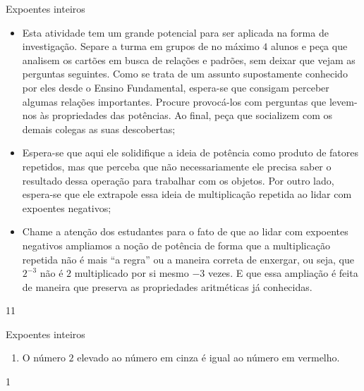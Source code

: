 \begin{sugestions}{Expoentes inteiros}
{
\begin{itemize}

\item Esta atividade tem um grande potencial para ser aplicada na forma de investigação. Separe a turma em grupos de no máximo $4$ alunos e peça que analisem os cartões em busca de relações e padrões, sem deixar que vejam as perguntas seguintes. Como se trata de um assunto supostamente conhecido por eles desde o Ensino Fundamental, espera-se que consigam perceber algumas relações importantes. Procure provocá-los com perguntas que levem-nos às propriedades das potências. Ao final, peça que socializem com os demais colegas as suas descobertas;

\item Espera-se que aqui ele solidifique a ideia de potência como produto de fatores repetidos, mas que perceba que não necessariamente ele precisa saber o resultado dessa operação para trabalhar com os objetos. Por outro lado, espera-se que ele extrapole essa ideia de multiplicação repetida ao lidar com expoentes negativos;

\item Chame a atenção dos estudantes para o fato de que ao lidar com expoentes negativos ampliamos a noção de potência de forma que a multiplicação repetida não é mais “a regra” ou a maneira correta de enxergar, ou seja, que $2^{-3}$ não é $2$ multiplicado por si mesmo $-3$ vezes. E que essa ampliação é feita de maneira que preserva as propriedades aritméticas já conhecidas.

\end{itemize}
}{1}{1}
\end{sugestions}
\begin{answer}{Expoentes inteiros}
{
\begin{enumerate}
\item
O número $2$ elevado ao número em cinza é igual ao número em vermelho.

\end{enumerate}
}{1}
\end{answer}
\clearmargin
